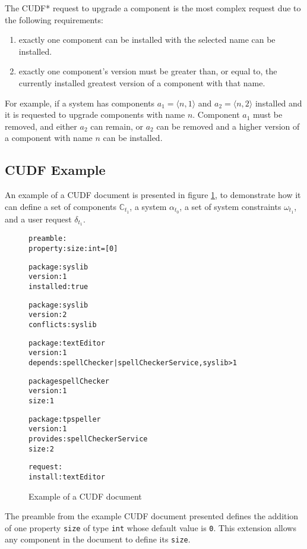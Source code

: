 The CUDF* request to upgrade a component is the most complex request due to the following requirements:
\begin{enumerate}
  \item exactly one component can be installed with  the selected name can be installed.
  \item exactly one component's version must be greater than, or equal to, the currently installed greatest version of a component with that name.
\end{enumerate}
For example, if a system has components $a_1 = \langle n,1 \rangle$ and $a_2 = \langle n,2 \rangle$ installed and it is requested to upgrade components with name $n$.
Component $a_1$ must be removed, and either $a_2$ can remain, or $a_2$ can be removed and a higher version of a component with name $n$ can be installed.

\subsection{CUDF Example}
\label{formal.example}
An example of a CUDF document is presented in figure \ref{formal.CUDFEXAMPLE},
to demonstrate how it can define a set of components $\mathbb{C}_{t_1}$, a system $\alpha_{t_{0}}$, 
a set of system constraints $\omega_{t_1}$, 
and a user request $\delta_{t_1}$.

\begin{figure}[ht] 
\begin{center}
\begin{alltt}
preamble:
property: size: int = [0]

package: syslib
version: 1
installed: true

package: syslib
version: 2
conflicts: syslib

package: textEditor
version: 1
depends: spellChecker | spellCheckerService, syslib > 1

package spellChecker
version: 1
size: 1

package: tpspeller
version: 1
provides: spellCheckerService
size: 2

request:
install:textEditor
\end{alltt}
  \caption{Example of a CUDF document}
  \label{formal.CUDFEXAMPLE}
\end{center}
\end{figure} 



The preamble from the example CUDF document presented defines the addition of one property \verb+size+ of type \verb+int+ whose default value is \verb+0+.
This extension allows any component in the document to define its \texttt{size}.

